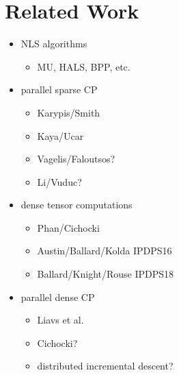 \section{Related Work} 
\label{sec:survey}

\begin{itemize}
	\item NLS algorithms
	\begin{itemize}
		\item MU, HALS, BPP, etc.
	\end{itemize}
	\item parallel sparse CP
	\begin{itemize}
		\item Karypis/Smith
		\item Kaya/Ucar
		\item Vagelis/Faloutsos?
		\item Li/Vuduc?
	\end{itemize}
	\item dense tensor computations
	\begin{itemize}
		\item Phan/Cichocki
		\item Austin/Ballard/Kolda IPDPS16
		\item Ballard/Knight/Rouse IPDPS18
	\end{itemize}
	\item parallel dense CP
	\begin{itemize}
		\item Liavs et al.
		\item Cichocki?
		\item distributed incremental descent?
	\end{itemize} 
\end{itemize}